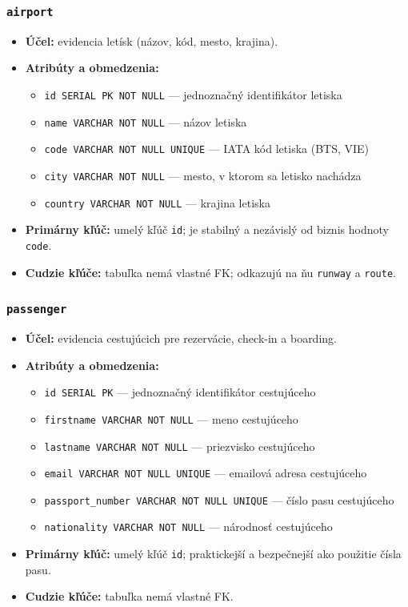 \documentclass[11pt, a4paper]{article}
\begin{document}
\subsubsection*{\texttt{airport}}
\begin{itemize}
    \item \textbf{Účel:} evidencia letísk (názov, kód, mesto, krajina).
    \item \textbf{Atribúty a obmedzenia:}
    \begin{itemize}
        \item \texttt{id SERIAL PK NOT NULL} --- jednoznačný identifikátor letiska
        \item \texttt{name VARCHAR NOT NULL} --- názov letiska
        \item \texttt{code VARCHAR NOT NULL UNIQUE} --- IATA kód letiska (BTS, VIE)
        \item \texttt{city VARCHAR NOT NULL} --- mesto, v ktorom sa letisko nachádza
        \item \texttt{country VARCHAR NOT NULL} --- krajina letiska
    \end{itemize}
    \item \textbf{Primárny kľúč:} umelý kľúč \texttt{id}; je stabilný a nezávislý od biznis hodnoty
        \texttt{code}.
    \item \textbf{Cudzie kľúče:} tabuľka nemá vlastné FK; odkazujú na ňu \texttt{runway} a \texttt{route}.
\end{itemize}

\subsubsection*{\texttt{passenger}}
\begin{itemize}
    \item \textbf{Účel:} evidencia cestujúcich pre rezervácie, check-in a boarding.
    \item \textbf{Atribúty a obmedzenia:}
    \begin{itemize}
        \item \texttt{id SERIAL PK} --- jednoznačný identifikátor cestujúceho
        \item \texttt{firstname VARCHAR NOT NULL} --- meno cestujúceho
        \item \texttt{lastname VARCHAR NOT NULL} --- priezvisko cestujúceho
        \item \texttt{email VARCHAR NOT NULL UNIQUE} --- emailová adresa cestujúceho
        \item \texttt{passport\_number VARCHAR NOT NULL UNIQUE} --- číslo pasu cestujúceho
        \item \texttt{nationality VARCHAR NOT NULL} --- národnosť cestujúceho
    \end{itemize}
    \item \textbf{Primárny kľúč:} umelý kľúč \texttt{id}; praktickejší a bezpečnejší ako použitie čísla pasu.
    \item \textbf{Cudzie kľúče:} tabuľka nemá vlastné FK.
\end{itemize}
\end{document}
